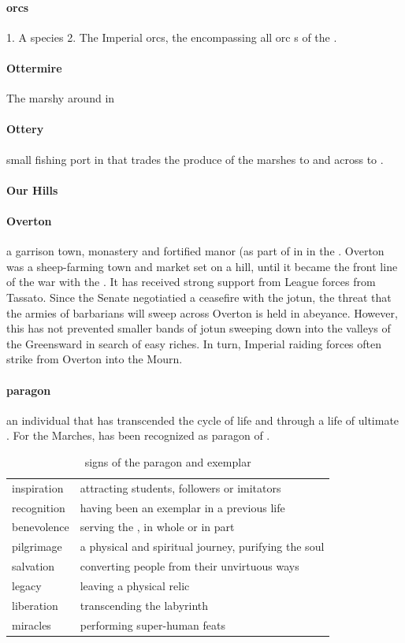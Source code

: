 \paragraph{orcs} 1. A species 2. The Imperial orcs, the  encompassing all orc s of the .
\paragraph{Ottermire} The marshy  around  in 
\paragraph{Ottery} small fishing port in  that trades the produce of the marshes to  and across  to .
\paragraph{Our Hills} 
\paragraph{Overton} a garrison town, monastery and fortified manor (as part of  in  in the . Overton was a sheep-farming town and market set on a hill, until it became the front line of the war with the . It has received strong support from League forces from Tassato. Since the Senate negotiatied a ceasefire with the jotun, the threat that the armies of barbarians will sweep across Overton is held in abeyance. However, this has not prevented smaller bands of jotun sweeping down into the valleys of the Greensward in search of easy riches. In turn, Imperial raiding forces often strike from Overton into the Mourn.
\paragraph{paragon} an individual that has transcended the cycle of life and  through a life of ultimate . For the Marches,  has been recognized as paragon of . \begin{table} \centering \begin{tabular}{ll} inspiration & attracting students, followers or imitators \\ recognition & having been an exemplar in a previous life \\ benevolence & serving the \s{Empire}, in whole or in part \\ pilgrimage & a physical and spiritual journey, purifying the soul \\ salvation & converting people from their unvirtuous ways \\ legacy & leaving a physical relic \\\hline liberation & transcending the labyrinth \\ miracles & performing super-human feats \end{tabular}\caption{signs of the paragon and exemplar}\end{table}
